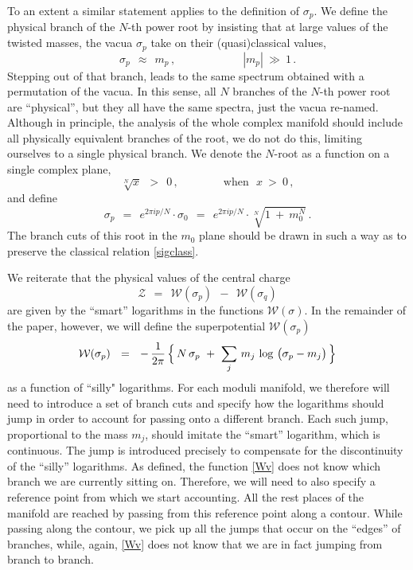 \documentclass[epsfig,12pt]{article}
\def\beq{\begin{equation}}
\def\eeq{\end{equation}}
\def\beq{\begin{equation}}
\def\eeq{\end{equation}}
\newcommand{\mc}[1]{\mathcal{#1}}
\newcommand{\W}{\mathcal{W}}
\begin{document}
	To an extent a similar statement applies to the definition of $ \sigma_p $.
	We define the physical branch of the $ N $-th power root by insisting that
	at large values of the twisted masses, the vacua $ \sigma_p $ take on their (quasi)classical values,
\beq
\label{sigclass}
	\sigma_p  ~~\approx~~ m_p\,,  \qquad\qquad\qquad |m_p| ~\gg~ 1\,.
\eeq
	Stepping out of that branch, leads to the same spectrum obtained with a permutation of the vacua.
	In this sense, all $ N $ branches of the $ N $-th power root are ``physical'', but they all have the
	same spectra, just the vacua re-named.
	Although in principle, the analysis of the whole complex manifold should include 
	all physically equivalent branches of the root, we do not do this, 
	limiting ourselves to a single physical branch.
	We denote the $ N $-root as a function on a single complex plane,  
\beq
	\sqrt[N]{x} ~~>~~ 0\,, \qquad\qquad \text{when~~} x ~>~ 0\,,
\eeq
	and define
\beq
	\sigma_p ~~=~~ e^{2 \pi i p / N} \cdot \sigma_0 ~~=~~ e^{2 \pi i p / N} \cdot \sqrt[N]{ 1 ~+~ m_0^N }\,.
\eeq
	The branch cuts of this root in the $ m_0 $ plane should be drawn in such a way as to preserve
	the classical relation \eqref{sigclass}.
	

	We reiterate that the physical values of the central charge 
\beq
\label{ccharge}
	\mc{Z} ~~=~~ \W(\sigma_p) ~~-~~ \W(\sigma_q)
\eeq
	are given by the ``smart'' logarithms in the functions $ \W(\sigma) $.
	In the remainder  of the paper, however, we will define the superpotential $ \W(\sigma_p) $
\beq
\label{Wv}
	\W ( \sigma_p ) ~~=~~ 
		-\, \frac{1}{2\pi}\,  
                \Bigl\{\, N\, \sigma_p ~+~ \sum_j\, m_j\, \log\, \big( \sigma_p - m_j \big) \,\Bigr\}
\eeq
	as a function of ``silly" logarithms. 
	For each moduli manifold, we therefore will need to introduce a set of branch cuts and 
	specify how the logarithms should jump in order to account for passing onto a different branch.
	Each such jump, proportional to the mass $ m_j $, should imitate the ``smart'' logarithm,
	which is continuous.
	The jump is introduced precisely to compensate for the discontinuity of the ``silly'' logarithms.
	As defined, the function \eqref{Wv} does not know which branch we are currently sitting on.
	Therefore, we will need to also specify a reference point from which we start accounting.
	All the rest places of the manifold are reached by passing from this reference point along a contour.
	While passing along the contour, we pick up all the jumps that occur on the ``edges'' of 
	branches, while, again, \eqref{Wv} does not know that we are in fact jumping from
	branch to branch.
\end{document}
